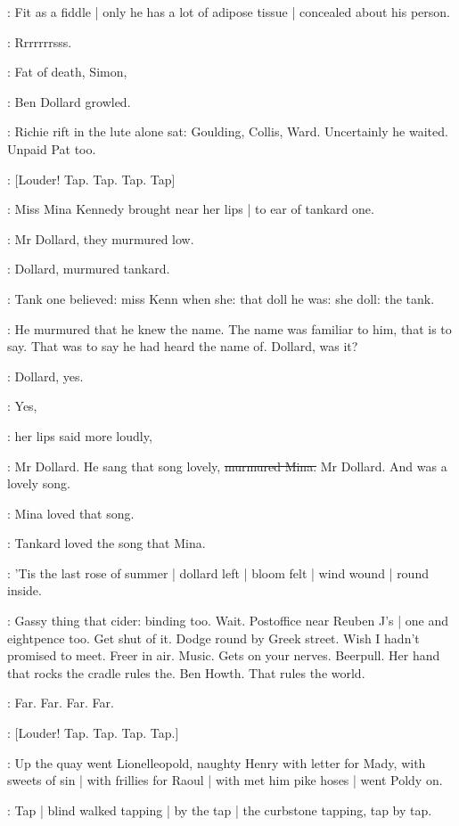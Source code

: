 \simon:
Fit as a fiddle |
only he has a lot of adipose tissue |
concealed about his person.

:
Rrrrrrrsss.

\dollard:
Fat of death,
Simon,

:
Ben Dollard growled.

:
Richie rift in the lute alone sat:
Goulding,
Collis,
Ward.
Uncertainly he waited.
Unpaid Pat too.

\stripling:
[Louder!
Tap.
Tap.
Tap.
Tap]

:
Miss Mina Kennedy brought near her lips |
to ear of tankard one.

:
Mr Dollard,
they murmured low.

:
Dollard,
murmured tankard.

:
Tank one believed:
miss Kenn when she:
that doll he was:
she doll:
the tank.

:
He murmured that he knew the name.
The name was familiar to him,
that is to say.
That was to say he had heard the name of.
Dollard,
was it?

:
Dollard,
yes.

\MissK:
Yes,

:
her lips said more loudly,

\MissK:
Mr Dollard.
He sang that song lovely,
\sout{murmured Mina.}
Mr Dollard.
And  was a lovely song.

:
Mina loved that song.

:
Tankard loved the song that Mina.

:
'Tis the last rose of summer |
dollard left |
bloom felt |
wind wound |
round inside.

\BloomInt:
Gassy thing that cider:
binding too.
Wait.
Postoffice near Reuben J's |
one and eightpence too.
Get shut of it.
Dodge round by Greek street.
Wish I hadn't promised to meet.
Freer in air.
Music.
Gets on your nerves.
Beerpull.
Her hand that rocks the cradle rules the.
Ben Howth.
That rules
the world.

:
Far.
Far.
Far.
Far.

\stripling:
[Louder!
Tap.
Tap.
Tap.
Tap.]

:
Up the quay went Lionelleopold,
naughty Henry with letter for Mady,
with sweets of sin |
with frillies for Raoul |
with met him pike hoses |
went Poldy on.

:
Tap |
blind walked
tapping |
by the tap |
the curbstone tapping,
tap by tap.

